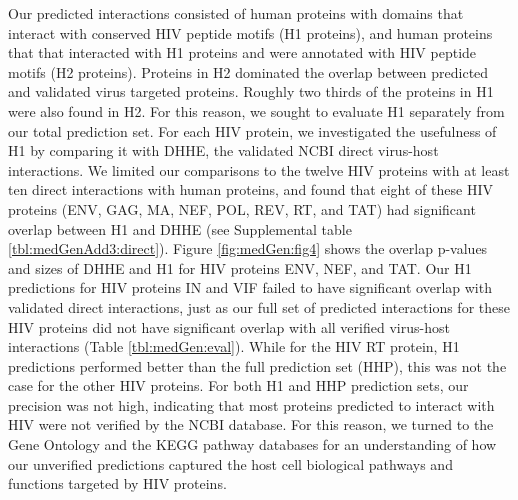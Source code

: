 Our predicted interactions consisted of human proteins with domains
that interact with conserved HIV peptide motifs (H1 proteins), and
human proteins that that interacted with H1 proteins and were
annotated with HIV peptide motifs (H2 proteins). Proteins in H2
dominated the overlap between predicted and validated virus targeted
proteins. Roughly two thirds of the proteins in H1 were also found in
H2. For this reason, we sought to evaluate H1 separately from our
total prediction set. For each HIV protein, we investigated the
usefulness of H1 by comparing it with DHHE, the validated NCBI direct
virus-host interactions. We limited our comparisons to the twelve HIV
proteins with at least ten direct interactions with human proteins,
and found that eight of these HIV proteins (ENV, GAG, MA, NEF, POL,
REV, RT, and TAT) had significant overlap between H1 and DHHE (see
Supplemental table \ref{tbl:medGenAdd3:direct}). Figure
\ref{fig:medGen:fig4} shows the overlap p-values and sizes of DHHE and
H1 for HIV proteins ENV, NEF, and TAT. Our H1 predictions for HIV
proteins IN and VIF failed to have significant overlap with validated
direct interactions, just as our full set of predicted interactions for
these HIV proteins did not have significant overlap with all verified
virus-host interactions (Table \ref{tbl:medGen:eval}). While for the
HIV RT protein, H1 predictions performed better than the full
prediction set (HHP), this was not the case for the other HIV
proteins. For both H1 and HHP prediction sets, our precision was not
high, indicating that most proteins predicted to interact with HIV
were not verified by the NCBI database. For this reason, we turned to
the Gene Ontology and the KEGG pathway databases for an understanding
of how our unverified predictions captured the host cell biological
pathways and functions targeted by HIV proteins.


